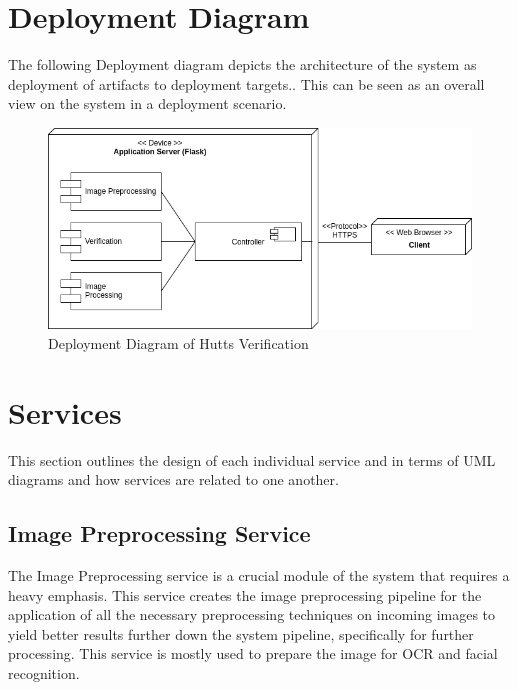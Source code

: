 \documentclass{article}
\begin{document}
\section{Deployment Diagram}
The following Deployment diagram depicts the architecture of the system as deployment of artifacts to deployment targets.. This can be seen as an overall view on the system in a deployment scenario.
\begin{figure}[h]
	    	\centering
	    	\includegraphics[scale=0.5]{img/Quant.png}
	    	\caption{Deployment Diagram of Hutts Verification}
	    \end{figure}
	    \pagebreak
	 
\section{Services}
This section outlines the design of each individual service and in terms of UML diagrams and how services are related to one another.

\subsection{Image Preprocessing Service}
The Image Preprocessing service is a crucial module of the system that requires a heavy emphasis. This service creates the image preprocessing pipeline for the application of all the necessary preprocessing techniques on incoming images to yield better results further down the system pipeline, specifically for further processing. This service is mostly used to prepare the image for OCR and facial recognition. 
\end{document}

